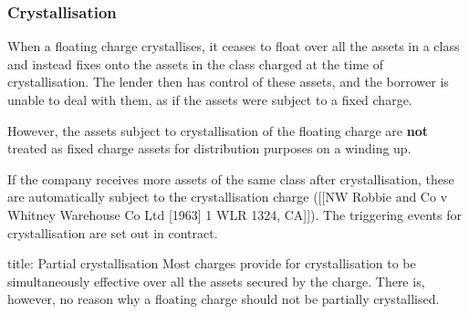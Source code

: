 \documentclass[
]{article}
\newenvironment{Shaded}{}{}
\newcommand{\NormalTok}[1]{#1}
\begin{document}
\hypertarget{crystallisation}{%
\subsubsection{Crystallisation}\label{crystallisation}}

When a floating charge crystallises, it ceases to float over all the
assets in a class and instead fixes onto the assets in the class charged
at the time of crystallisation. The lender then has control of these
assets, and the borrower is unable to deal with them, as if the assets
were subject to a fixed charge.

However, the assets subject to crystallisation of the floating charge
are \textbf{not} treated as fixed charge assets for distribution
purposes on a winding up.

If the company receives more assets of the same class after
crystallisation, these are automatically subject to the crystallisation
charge ({[}{[}NW Robbie and Co v Whitney Warehouse Co Ltd {[}1963{]} 1
WLR 1324, CA{]}{]}). The triggering events for crystallisation are set
out in contract.

\begin{Shaded}
\begin{Highlighting}[]
\NormalTok{title: Partial crystallisation}
\NormalTok{Most charges provide for crystallisation to be simultaneously effective over all the assets secured by the charge. There is, however, no reason why a floating charge should not be partially crystallised.}
\end{Highlighting}
\end{Shaded}
\end{document}
